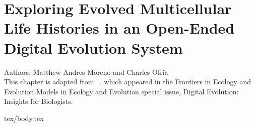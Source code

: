 \chapter{Exploring Evolved Multicellular Life Histories in an Open-Ended Digital Evolution System}
\label{ch:case-studies}

\noindent
Authors: Matthew Andres Moreno and Charles Ofria \\
This chapter is adapted from ~\citep{moreno2021exploring}, which appeared in the Frontiers in Ecology and Evolution Models in Ecology and Evolution special issue, Digital Evolution: Insights for Biologists.

{tex/body.tex}
